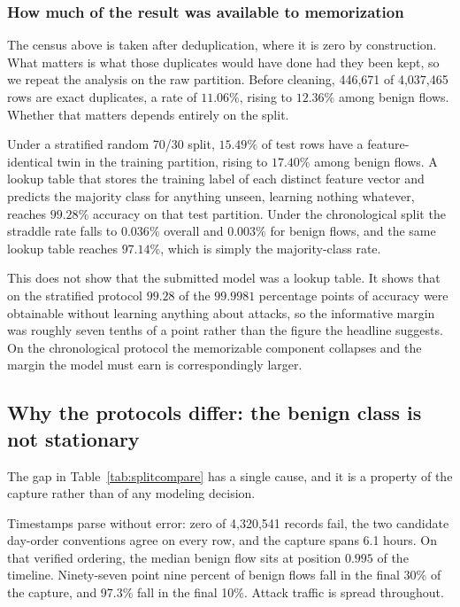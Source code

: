 \documentclass{ieeeaccess}
\begin{document}
\subsubsection{How much of the result was available to memorization}
\label{sec:memorization}
The census above is taken after deduplication, where it is zero by
construction. What matters is what those duplicates would have done had they been
kept, so we repeat the analysis on the raw partition. Before cleaning, 446,671 of
4,037,465 rows are exact duplicates, a rate of $11.06\%$, rising to $12.36\%$
among benign flows. Whether that matters depends entirely on the split.

Under a stratified random 70/30 split, $15.49\%$ of test rows have a
feature-identical twin in the training partition, rising to $17.40\%$ among
benign flows. A lookup table that stores the training label of each distinct
feature vector and predicts the majority class for anything unseen, learning
nothing whatever, reaches $99.28\%$ accuracy on that test partition. Under the
chronological split the straddle rate falls to $0.036\%$ overall and $0.003\%$
for benign flows, and the same lookup table reaches $97.14\%$, which is simply
the majority-class rate.

This does not show that the submitted model was a lookup table. It shows that on
the stratified protocol $99.28$ of the $99.9981$ percentage points of accuracy
were obtainable without learning anything about attacks, so the informative
margin was roughly seven tenths of a point rather than the figure the headline
suggests. On the chronological protocol the memorizable component collapses and
the margin the model must earn is correspondingly larger.

\subsection{Why the protocols differ: the benign class is not stationary}
\label{sec:benignstructure}
\label{sec:temporal}
The gap in Table~\ref{tab:splitcompare} has a single cause, and it is a property
of the capture rather than of any modeling decision.

Timestamps parse without error: zero of 4,320,541 records fail, the two candidate
day-order conventions agree on every row, and the capture spans 6.1 hours. On that
verified ordering, the median benign flow sits at position $0.995$ of the
timeline. Ninety-seven point nine percent of benign flows fall in the final 30\%
of the capture, and 97.3\% fall in the final 10\%. Attack traffic is spread
throughout.
\end{document}
